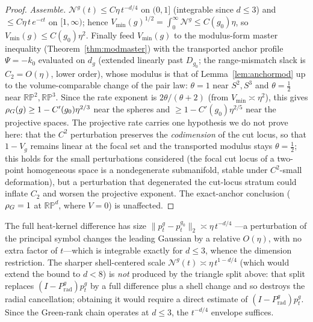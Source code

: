 \begin{proof}
\emph{Assemble.} $\mathcal N^g(t)\le C\eta\,t^{-d/4}$ on $(0,1]$ (integrable since $d\le3$) and
$\le C\eta\,t\,e^{-ct}$ on $[1,\infty)$; hence $V_{\min}(g)^{1/2}=\int_0^\infty\mathcal N^g\le
C(g_0)\eta$, so $V_{\min}(g)\le C(g_0)\eta^2$. Finally feed $V_{\min}(g)$ to the modulus-form
master inequality (Theorem~\ref{thm:modmaster}) with the transported anchor profile $\Psi=-k_0$
evaluated on $d_g$ (extended linearly past $D_{g_0}$; the range-mismatch slack is $C_2=O(\eta)$,
lower order), whose modulus is that of Lemma~\ref{lem:anchormod} up to the volume-comparable
change of the pair law: $\theta=1$ near $S^2,S^3$ and $\theta=\tfrac12$ near
$\mathbb{RP}^2,\mathbb{RP}^3$. Since the rate exponent is $2\theta/(\theta+2)$ (from
$V_{\min}\asymp\eta^2$), this gives $\rho_G(g)\ge1-C'(g_0)\eta^{2/3}$ near the spheres and
$\ge1-C'(g_0)\eta^{2/5}$ near the projective spaces. The projective rate carries one
hypothesis we do not prove here: that the $C^2$ perturbation preserves the
\emph{codimension} of the cut locus, so that $1-V_g$ remains linear at the focal set and the
transported modulus stays $\theta=\tfrac12$; this holds for the small perturbations considered
(the focal cut locus of a two-point homogeneous space is a nondegenerate submanifold, stable
under $C^2$-small deformation), but a perturbation that degenerated the cut-locus stratum could
inflate $C_2$ and worsen the projective exponent. The exact-anchor conclusion ($\rho_G=1$ at
$\mathbb{RP}^d$, where $V=0$) is unaffected.
\end{proof}

\begin{remark}\label{rem:pert-scope}
The full heat-kernel difference has size $\lVert p_t^g-p_t^{g_0}\rVert_2\asymp\eta\,t^{-d/4}$
---a perturbation of the principal symbol changes the leading Gaussian by a relative $O(\eta)$,
with no extra factor of $t$---which is integrable exactly for $d\le3$, whence the dimension
restriction. The sharper shell-centered scale $\mathcal N^g(t)\asymp\eta\,t^{1-d/4}$ (which
would extend the bound to $d<8$) is \emph{not} produced by the triangle split above: that split
replaces $(I-P^g_{\mathrm{rad}})p_t^g$ by a full difference plus a shell change and so destroys
the radial cancellation; obtaining it would require a direct estimate of
$(I-P^g_{\mathrm{rad}})p_t^g$. Since the Green-rank chain operates at $d\le3$, the $t^{-d/4}$
envelope suffices.
\end{remark}


